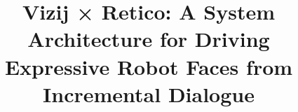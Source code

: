 \documentclass[conference]{IEEEtran}
\begin{document}
\title{Vizij × Retico: A System Architecture for Driving Expressive Robot Faces from Incremental Dialogue}

\end{document}
